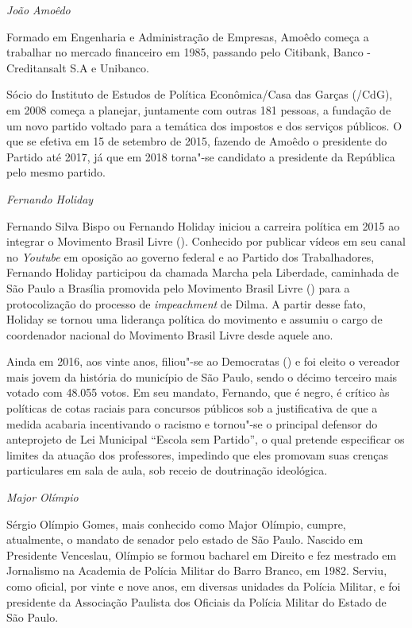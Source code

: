 \emph{João Amoêdo}

Formado em Engenharia e Administração de Empresas, Amoêdo começa a
trabalhar no mercado financeiro em 1985, passando pelo Citibank, Banco
-Creditansalt S.A e Unibanco.

Sócio do Instituto de Estudos de Política Econômica/Casa das Garças
(/CdG), em 2008 começa a planejar, juntamente com outras 181
pessoas, a fundação de um novo partido voltado para a temática dos
impostos e dos serviços públicos. O que se efetiva em 15 de setembro de
2015, fazendo de Amoêdo o presidente do Partido até 2017, já que em 2018
torna"-se candidato a presidente da República pelo mesmo partido.

\emph{Fernando Holiday}

Fernando Silva Bispo ou Fernando Holiday iniciou a carreira política em
2015 ao integrar o Movimento Brasil Livre (). Conhecido por publicar
vídeos em seu canal no \emph{Youtube} em oposição ao governo federal e
ao Partido dos Trabalhadores, Fernando Holiday participou da chamada
Marcha pela Liberdade, caminhada de São Paulo a Brasília promovida pelo
Movimento Brasil Livre () para a protocolização do processo de
\emph{impeachment} de Dilma. A partir desse fato, Holiday se tornou uma
liderança política do movimento e assumiu o cargo de coordenador
nacional do Movimento Brasil Livre desde aquele ano.

Ainda em 2016, aos vinte anos, filiou"-se ao Democratas () e foi
eleito o vereador mais jovem da história do município de São Paulo,
sendo o décimo terceiro mais votado com 48.055 votos. Em seu mandato,
Fernando, que é negro, é crítico às políticas de cotas raciais para
concursos públicos sob a justificativa de que a medida acabaria
incentivando o racismo e tornou"-se o principal defensor do anteprojeto
de Lei Municipal ``Escola sem Partido'', o qual pretende especificar os
limites da atuação dos professores, impedindo que eles promovam suas
crenças particulares em sala de aula, sob receio de doutrinação
ideológica.

\emph{Major Olímpio}

Sérgio Olímpio Gomes, mais conhecido como Major Olímpio, cumpre,
atualmente, o mandato de senador pelo estado de São Paulo. Nascido em
Presidente Venceslau, Olímpio se formou bacharel em Direito e fez
mestrado em Jornalismo na Academia de Polícia Militar do Barro Branco,
em 1982. Serviu, como oficial, por vinte e nove anos, em diversas
unidades da Polícia Militar, e foi presidente da Associação Paulista dos
Oficiais da Polícia Militar do Estado de São Paulo.

